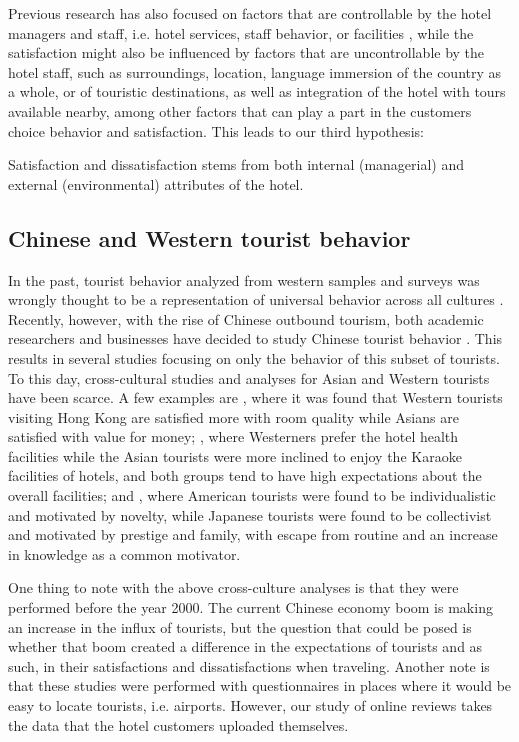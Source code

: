 Previous research has also focused on factors that are controllable by the hotel managers and staff, i.e. hotel services, staff behavior, or facilities \cite[e.g.][]{shanka2004, choi2001}, while the satisfaction might also be influenced by factors that are uncontrollable by the hotel staff, such as surroundings, location, language immersion of the country as a whole, or of touristic destinations, as well as integration of the hotel with tours available nearby, among other factors that can play a part in the customers choice behavior and satisfaction. 
This leads to our third hypothesis:

\begin{hyp}
\label{hyp:3}
Satisfaction and dissatisfaction stems from both internal (managerial) and external (environmental) attributes of the hotel.
\end{hyp}

\subsection{Chinese and Western tourist behavior}\label{theory_zh_en}

In the past, tourist behavior analyzed from western samples and surveys was wrongly thought to be a representation of universal behavior across all cultures \cite[][]{nielsen2017, jones2010WEIRD, guaratne2009, hogan1978biases}. Recently, however, with the rise of Chinese outbound tourism, both academic researchers and businesses have decided to study Chinese tourist behavior \cite[][]{sun2017}. This results in several studies focusing on only the behavior of this subset of tourists. To this day, cross-cultural studies and analyses for Asian and Western tourists have been scarce. A few examples are \cite{choi2000}, where it was found that Western tourists visiting Hong Kong are satisfied more with room quality while Asians are satisfied with value for money; \cite{bauer1993changing}, where Westerners prefer the hotel health facilities while the Asian tourists were more inclined to enjoy the Karaoke facilities of hotels, and both groups tend to have high expectations about the overall facilities; and \cite{kim2000}, where American tourists were found to be individualistic and motivated by novelty, while Japanese tourists were found to be collectivist and motivated by prestige and family, with escape from routine and an increase in knowledge as a common motivator. 

One thing to note with the above cross-culture analyses is that they were performed before the year 2000. The current Chinese economy boom is making an increase in the influx of tourists, but the question that could be posed is whether that boom created a difference in the expectations of tourists and as such, in their satisfactions and dissatisfactions when traveling. Another note is that these studies were performed with questionnaires in places where it would be easy to locate tourists, i.e. airports. However, our study of online reviews takes the data that the hotel customers uploaded themselves.

